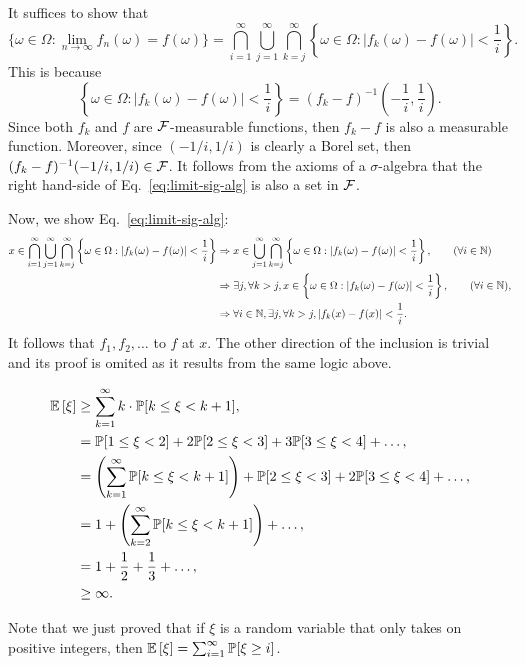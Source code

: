 \begin{problem}{1}
\end{problem}
\begin{solution}
    It suffices to show that 
    \begin{equation}\label{eq:limit-sig-alg}
        \{\omega \in \Omega: \lim_{n\to\infty} f_n(\omega) = f(\omega)\} = \bigcap_{i=1}^\infty \bigcup_{j=1}^\infty \bigcap_{k=j}^\infty \left\{\omega \in \Omega : |f_k(\omega) - f(\omega)| < \frac{1}{i}\right\}.
    \end{equation}
    This is because
    \[
        \left\{\omega \in \Omega : |f_k(\omega) - f(\omega)| < \frac{1}{i}\right\} =  (f_k - f)^{-1}\left(-\frac{1}{i},\frac{1}{i}\right).
    \]
    Since both $f_k$ and $f$ are $\mathcal{F}$-measurable functions, then $f_k - f$ is also a measurable function. Moreover, since $(-1/i, 1/i)$ is clearly a Borel set, then $(f_k - f)^{-1}(-1/i, 1/i) \in \mathcal{F}$. It follows from the axioms of a $\sigma$-algebra that the right hand-side of Eq.~\ref{eq:limit-sig-alg} is also a set in $\mathcal{F}$. 

    Now, we show Eq.~\ref{eq:limit-sig-alg}:
    \begin{align*}
        x \in \bigcap_{i=1}^\infty \bigcup_{j=1}^\infty \bigcap_{k=j}^\infty \left\{\omega \in \Omega : |f_k(\omega) - f(\omega)| < \frac{1}{i}\right\} &\Rightarrow x \in \bigcup_{j=1}^\infty\bigcap_{k=j}^\infty \left\{\omega \in \Omega : |f_k(\omega) - f(\omega)| <  \frac{1}{i}\right\}, \tag{$\forall i \in \N$} \\
        &\Rightarrow \exists j, \forall k > j, x\in \left\{\omega \in \Omega : |f_k(\omega) - f(\omega)| <  \frac{1}{i}\right\}, \tag{$\forall i \in \N$}, \\
        &\Rightarrow \forall i \in \N, \exists j, \forall k > j, |f_k(x) - f(x)| < \frac{1}{i}.
    \end{align*}
    It follows that $f_1,f_2,\ldots$ to $f$ at $x$. The other direction of the inclusion is trivial and its proof is omited as it results from the same logic above.
\end{solution}

\begin{problem}{2}
\end{problem}
\begin{solution}
    \begin{align*}
        \mathbb{E}\left[\xi\right] &\geq \sum_{k=1}^\infty k\cdot \mathbb{P}[k \leq \xi < k + 1], \\
        &= \mathbb{P}[1 \leq \xi < 2] + 2\mathbb{P}[2 \leq \xi < 3] + 3\mathbb{P}[3 \leq \xi < 4] + \ldots, \\
        &= \left(\sum_{k=1}^\infty \mathbb{P}[k \leq \xi < k+1]\right) + \mathbb{P}[2\leq \xi < 3] + 2\mathbb{P}[3 \leq \xi < 4] + \ldots, \\
        &= 1 + \left(\sum_{k=2}^\infty \mathbb{P}[k \leq \xi < k+1]\right) + \ldots, \\
        &= 1 + \frac{1}{2} + \frac{1}{3} + \ldots, \\
        &\geq \infty.
    \end{align*}
\end{solution}
Note that we just proved that if $\xi$ is a random variable that only takes on positive integers, then $\mathbb{E}\left[\xi\right] = \sum_{i=1}^\infty \mathbb{P}[\xi \geq i]$.

